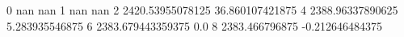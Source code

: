 0 nan nan
1 nan nan
2 2420.53955078125 36.860107421875
4 2388.96337890625 5.283935546875
6 2383.679443359375 0.0
8 2383.466796875 -0.212646484375
